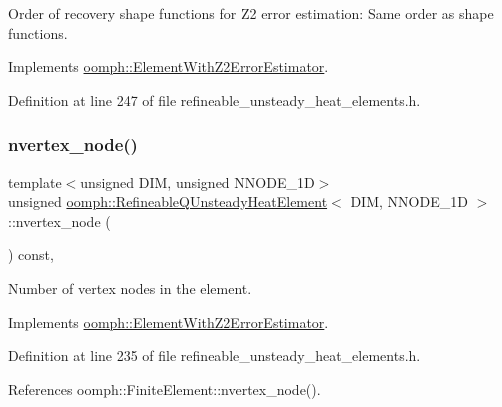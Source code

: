 Order of recovery shape functions for Z2 error estimation\+: Same order as shape functions. 



Implements \hyperlink{classoomph_1_1ElementWithZ2ErrorEstimator_af39480835bd3e0f6b2f4f7a9a4044798}{oomph\+::\+Element\+With\+Z2\+Error\+Estimator}.



Definition at line 247 of file refineable\+\_\+unsteady\+\_\+heat\+\_\+elements.\+h.

\mbox{\label{classoomph_1_1RefineableQUnsteadyHeatElement_a5492bc9cbf7a118fe4c707ba3c7e9685}} 
\subsubsection{\texorpdfstring{nvertex\+\_\+node()}{nvertex\_node()}}
{\footnotesize\ttfamily template$<$unsigned D\+IM, unsigned N\+N\+O\+D\+E\+\_\+1D$>$ \\
unsigned \hyperlink{classoomph_1_1RefineableQUnsteadyHeatElement}{oomph\+::\+Refineable\+Q\+Unsteady\+Heat\+Element}$<$ D\+IM, N\+N\+O\+D\+E\+\_\+1D $>$\+::nvertex\+\_\+node (\begin{DoxyParamCaption}{ }\end{DoxyParamCaption}) const\hspace{0.3cm}{\ttfamily [inline]}, {\ttfamily [virtual]}}



Number of vertex nodes in the element. 



Implements \hyperlink{classoomph_1_1ElementWithZ2ErrorEstimator_a19495a0e77ef4ff35f15fdf7913b4077}{oomph\+::\+Element\+With\+Z2\+Error\+Estimator}.



Definition at line 235 of file refineable\+\_\+unsteady\+\_\+heat\+\_\+elements.\+h.



References oomph\+::\+Finite\+Element\+::nvertex\+\_\+node().

\mbox{\label{classoomph_1_1RefineableQUnsteadyHeatElement_add4a7e0089818e439e156d1ed7c9fd6f}} 
